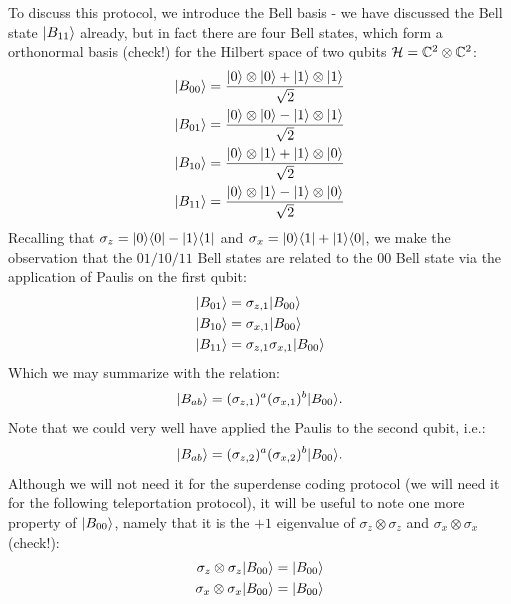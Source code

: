 To discuss this protocol, we introduce the Bell basis - we have discussed the Bell state $\lvert B_{11} \rangle$ already, but in fact there are four Bell states, which form a orthonormal basis (check!) for the Hilbert space of two qubits $\mathcal{H} = \mathbb{C}^2 \otimes \mathbb{C}^2$:
\begin{equation}
    \begin{split}
        \lvert B_{00} \rangle &= \frac{\lvert 0 \rangle\otimes \lvert 0 \rangle + \lvert 1 \rangle \otimes \lvert 1 \rangle}{\sqrt{2}}
        \\ \lvert B_{01} \rangle &= \frac{\lvert 0 \rangle\otimes \lvert 0 \rangle - \lvert 1 \rangle \otimes \lvert 1 \rangle}{\sqrt{2}}
        \\ \lvert B_{10} \rangle &= \frac{\lvert 0 \rangle\otimes \lvert 1 \rangle + \lvert 1 \rangle \otimes \lvert 0 \rangle}{\sqrt{2}}
        \\ \lvert B_{11} \rangle &= \frac{\lvert 0 \rangle\otimes \lvert 1 \rangle - \lvert 1 \rangle \otimes \lvert 0 \rangle}{\sqrt{2}}
    \end{split}
\end{equation}
Recalling that $\sigma_z = \lvert 0 \rangle \langle 0 \rvert - \lvert 1 \rangle \langle 1 \rvert$ and $\sigma_x = \lvert 0 \rangle \langle 1 \rvert + \lvert 1 \rangle \langle 0 \rvert$, we make the observation that the $01/10/11$ Bell states are related to the $00$ Bell state via the application of Paulis on the first qubit:
\begin{equation}\label{eq-BellstatePaulis}
    \begin{split}
        \lvert B_{01} \rangle &= \sigma_{z, 1}\lvert B_{00} \rangle
        \\ \lvert B_{10} \rangle &= \sigma_{x, 1}\lvert B_{00} \rangle
        \\ \lvert B_{11} \rangle &= \sigma_{z, 1}\sigma_{x, 1}\lvert B_{00} \rangle
    \end{split}
\end{equation}
Which we may summarize with the relation:
\begin{equation}
    \lvert B_{ab} \rangle = (\sigma_{z, 1})^a(\sigma_{x, 1})^b\lvert B_{00} \rangle.
\end{equation}
Note that we could very well have applied the Paulis to the second qubit, i.e.:
\begin{equation}
    \lvert B_{ab} \rangle = (\sigma_{z, 2})^a(\sigma_{x, 2})^b\lvert B_{00} \rangle.
\end{equation}
Although we will not need it for the superdense coding protocol (we will need it for the following teleportation protocol), it will be useful to note one more property of $\lvert B_{00} \rangle$, namely that it is the $+1$ eigenvalue of $\sigma_z \otimes \sigma_z$ and $\sigma_x \otimes \sigma_x$ (check!):
\begin{equation}\label{eq-Bellstabilizers}
    \begin{split}
    \sigma_z \otimes \sigma_z \lvert B_{00} \rangle &= \lvert B_{00} \rangle
    \\ \sigma_x \otimes \sigma_x \lvert B_{00} \rangle &= \lvert B_{00} \rangle
    \end{split}
\end{equation}
